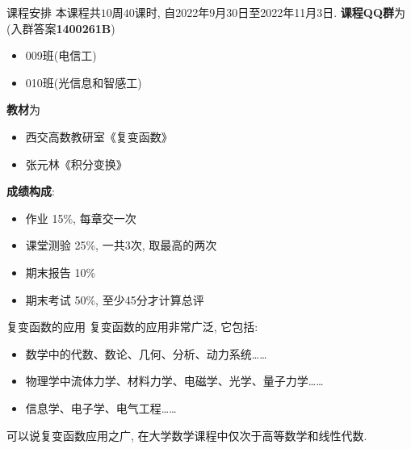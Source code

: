 \begin{frame}{课程安排}
\onslide<+->
本课程共$10$周$40$课时,
\onslide<+->
自2022年9月30日至2022年11月3日.
\onslide<+->
\textbf{课程QQ群}为 (入群答案\textbf{1400261B})
\begin{itemize}[<*>]
\item 009班(电信工) 
\item 010班(光信息和智感工) 
\end{itemize}

\onslide<+->
\textbf{教材}为
\begin{itemize}[<*>]
\item 西交高数教研室《复变函数》
\item 张元林《积分变换》
\end{itemize}

\onslide<+->
\textbf{成绩构成}:
\begin{itemize}
\item 作业 15\%, 每章交一次
\item 课堂测验 25\%, 一共3次, 取最高的两次
\item 期末报告 10\%
\item 期末考试 50\%, 至少45分才计算总评
\end{itemize}
\end{frame}


\begin{frame}{复变函数的应用}
\onslide<+->
复变函数的应用非常广泛, 它包括:
\begin{itemize}
\item 数学中的代数、数论、几何、分析、动力系统……
\item 物理学中流体力学、材料力学、电磁学、光学、量子力学……
\item 信息学、电子学、电气工程……
\end{itemize}
\onslide<+->
可以说复变函数应用之广, 在大学数学课程中仅次于高等数学和线性代数.
\end{frame}


